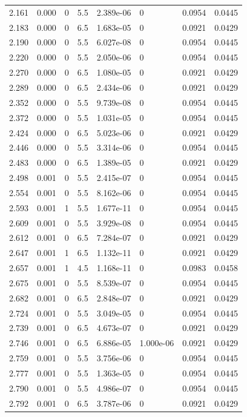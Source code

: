 \documentclass[preview]{standalone}
\begin{document}
{{{\begin{tabular}{L{1.2cm}C{1.2cm} C{0.3cm}C{0.5cm} C{1.4cm}C{1.4cm} C{1.4cm}C{1.4cm}}
  2.161  &  0.000  & 0     & 5.5 &  2.389e-06  & 0  & 0.0954 &  0.0445   \\ 
  2.183  &  0.000  & 0     & 6.5 &  1.683e-05  & 0  & 0.0921 &  0.0429   \\ 
  2.190  &  0.000  & 0     & 5.5 &  6.027e-08  & 0  & 0.0954 &  0.0445   \\ 
  2.220  &  0.000  & 0     & 5.5 &  2.050e-06  & 0  & 0.0954 &  0.0445   \\ 
  2.270  &  0.000  & 0     & 6.5 &  1.080e-05  & 0  & 0.0921 &  0.0429   \\ 
  2.289  &  0.000  & 0     & 6.5 &  2.434e-06  & 0  & 0.0921 &  0.0429   \\ 
  2.352  &  0.000  & 0     & 5.5 &  9.739e-08  & 0  & 0.0954 &  0.0445   \\ 
  2.372  &  0.000  & 0     & 5.5 &  1.031e-05  & 0  & 0.0954 &  0.0445   \\ 
  2.424  &  0.000  & 0     & 6.5 &  5.023e-06  & 0  & 0.0921 &  0.0429   \\ 
  2.446  &  0.000  & 0     & 5.5 &  3.314e-06  & 0  & 0.0954 &  0.0445   \\ 
  2.483  &  0.000  & 0     & 6.5 &  1.389e-05  & 0  & 0.0921 &  0.0429   \\ 
  2.498  &  0.001  & 0     & 5.5 &  2.415e-07  & 0  & 0.0954 &  0.0445   \\ 
  2.554  &  0.001  & 0     & 5.5 &  8.162e-06  & 0  & 0.0954 &  0.0445   \\ 
  2.593  &  0.001  & 1     & 5.5 &  1.677e-11  & 0  & 0.0954 &  0.0445   \\ 
  2.609  &  0.001  & 0     & 5.5 &  3.929e-08  & 0  & 0.0954 &  0.0445   \\ 
  2.612  &  0.001  & 0     & 6.5 &  7.284e-07  & 0  & 0.0921 &  0.0429   \\ 
  2.647  &  0.001  & 1     & 6.5 &  1.132e-11  & 0  & 0.0921 &  0.0429   \\ 
  2.657  &  0.001  & 1     & 4.5 &  1.168e-11  & 0  & 0.0983 &  0.0458   \\ 
  2.675  &  0.001  & 0     & 5.5 &  8.539e-07  & 0  & 0.0954 &  0.0445   \\ 
  2.682  &  0.001  & 0     & 6.5 &  2.848e-07  & 0  & 0.0921 &  0.0429   \\ 
  2.724  &  0.001  & 0     & 5.5 &  3.049e-05  & 0  & 0.0954 &  0.0445   \\ 
  2.739  &  0.001  & 0     & 6.5 &  4.673e-07  & 0  & 0.0921 &  0.0429   \\ 
  2.746  &  0.001  & 0     & 6.5 &  6.886e-05  & 1.000e-06  & 0.0921 &  0.0429   \\ 
  2.759  &  0.001  & 0     & 5.5 &  3.756e-06  & 0  & 0.0954 &  0.0445   \\ 
  2.777  &  0.001  & 0     & 5.5 &  1.363e-05  & 0  & 0.0954 &  0.0445   \\ 
  2.790  &  0.001  & 0     & 5.5 &  4.986e-07  & 0  & 0.0954 &  0.0445   \\ 
  2.792  &  0.001  & 0     & 6.5 &  3.787e-06  & 0  & 0.0921 &  0.0429   \\ 
\hline 
\end{tabular} 

}}}
\end{document}
